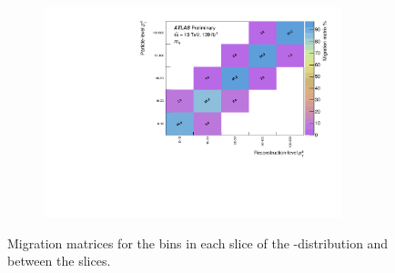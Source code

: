 \begin{figure}[htb]
  \begin{subfigure}{.49\textwidth}\centering\includegraphics[width = 0.95\textwidth]{Figures/m4l/UnfoldingStudies/v014_matrices/m4l_pt4lMatrix.pdf}\end{subfigure}
 \caption{Migration matrices for the \mFourL bins in each \ptFourL slice of the \mFourL-\ptFourL distribution and between the slices.\label{fig:pt4lmat}}
\end{figure}


